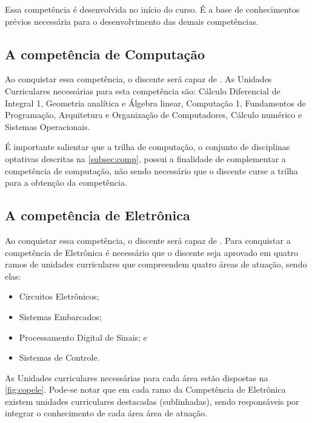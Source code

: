 Essa competência é desenvolvida no início do curso. É a base de conhecimentos prévios necessária para o desenvolvimento das demais competências.

\subsection{A competência de Computação}

Ao conquistar essa competência, o discente será capaz de \textbf{\compComp}. As Unidades Curriculares necessárias para esta competência são: Cálculo Diferencial de Integral 1, Geometria analítica e Álgebra linear, Computação 1, Fundamentos de Programação, Arquitetura e Organização de Computadores, Cálculo numérico e Sistemas Operacionais.

É importante salientar que a trilha de computação, o conjunto de disciplinas optativas descritas na \autoref{subsec:comp}, possui a finalidade de complementar a competência de computação, não sendo necessário que o discente curse a trilha para a obtenção da competência.

\subsection{A competência de Eletrônica}

Ao conquistar essa competência, o discente será capaz de \textbf{\compTron}. Para conquistar a competência de Eletrônica é necessário que o discente seja aprovado em quatro ramos de unidades curriculares que compreendem quatro áreas de atuação, sendo elas:

\begin{itemize}
    \item Circuitos Eletrônicos;
    \item Sistemas Embarcados;
    \item Processamento Digital de Sinais; e
    \item Sistemas de Controle.
\end{itemize}

As Unidades curriculares necessárias para cada área estão dispostas na \autoref{fig:copele}. Pode-se notar que em cada ramo da Competência de Eletrônica existem unidades curriculares destacadas (sublinhadas), sendo responsáveis por integrar o conhecimento de cada área área de atuação.

